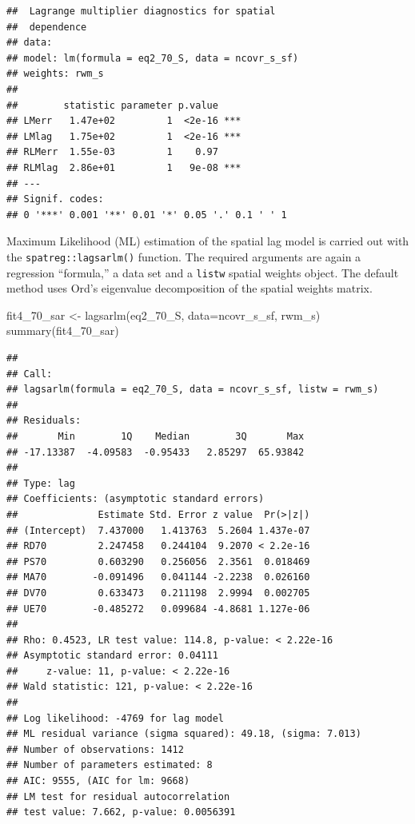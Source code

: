 \documentclass[
  krantz2]{krantz}
\makeatletter
\newenvironment{Shaded}{\begin{snugshade}}{\end{snugshade}}
\newcommand{\AttributeTok}[1]{\textcolor[rgb]{0.61,0.61,0.61}{#1}}
\newcommand{\FunctionTok}[1]{\textcolor[rgb]{0,0,0}{#1}}
\newcommand{\NormalTok}[1]{#1}
\newcommand{\OtherTok}[1]{\textcolor[rgb]{0.37,0.37,0.37}{#1}}
\newenvironment{kframe}{%
\medskip{}
\setlength{\fboxsep}{.8em}
 \def\at@end@of@kframe{}%
 \ifinner\ifhmode%
  \def\at@end@of@kframe{\end{minipage}}%
  \begin{minipage}{\columnwidth}%
 \fi\fi%
 \def\FrameCommand##1{\hskip\@totalleftmargin \hskip-\fboxsep
 \colorbox{shadecolor}{##1}\hskip-\fboxsep
     \hskip-\linewidth \hskip-\@totalleftmargin \hskip\columnwidth}%
 \MakeFramed {\advance\hsize-\width
   \@totalleftmargin\z@ \linewidth\hsize
   \@setminipage}}%
 {\par\unskip\endMakeFramed%
 \at@end@of@kframe}
\renewenvironment{Shaded}{\begin{kframe}}{\end{kframe}}
\makeatother
\begin{document}
\begin{verbatim}
##  Lagrange multiplier diagnostics for spatial
##  dependence
## data:  
## model: lm(formula = eq2_70_S, data = ncovr_s_sf)
## weights: rwm_s
##  
##        statistic parameter p.value    
## LMerr   1.47e+02         1  <2e-16 ***
## LMlag   1.75e+02         1  <2e-16 ***
## RLMerr  1.55e-03         1    0.97    
## RLMlag  2.86e+01         1   9e-08 ***
## ---
## Signif. codes:  
## 0 '***' 0.001 '**' 0.01 '*' 0.05 '.' 0.1 ' ' 1
\end{verbatim}

Maximum Likelihood (ML) estimation of the spatial lag model is carried out with the \texttt{spatreg::lagsarlm()} function. The required arguments are again a regression ``formula,'' a data set and a \texttt{listw} spatial weights object. The default method uses Ord's eigenvalue decomposition of the spatial weights matrix.

\begin{Shaded}
\begin{Highlighting}[]
\NormalTok{fit4\_70\_sar }\OtherTok{\textless{}{-}} \FunctionTok{lagsarlm}\NormalTok{(eq2\_70\_S, }\AttributeTok{data=}\NormalTok{ncovr\_s\_sf, rwm\_s)}
\FunctionTok{summary}\NormalTok{(fit4\_70\_sar)}
\end{Highlighting}
\end{Shaded}

\begin{verbatim}
## 
## Call:
## lagsarlm(formula = eq2_70_S, data = ncovr_s_sf, listw = rwm_s)
## 
## Residuals:
##       Min        1Q    Median        3Q       Max 
## -17.13387  -4.09583  -0.95433   2.85297  65.93842 
## 
## Type: lag 
## Coefficients: (asymptotic standard errors) 
##              Estimate Std. Error z value  Pr(>|z|)
## (Intercept)  7.437000   1.413763  5.2604 1.437e-07
## RD70         2.247458   0.244104  9.2070 < 2.2e-16
## PS70         0.603290   0.256056  2.3561  0.018469
## MA70        -0.091496   0.041144 -2.2238  0.026160
## DV70         0.633473   0.211198  2.9994  0.002705
## UE70        -0.485272   0.099684 -4.8681 1.127e-06
## 
## Rho: 0.4523, LR test value: 114.8, p-value: < 2.22e-16
## Asymptotic standard error: 0.04111
##     z-value: 11, p-value: < 2.22e-16
## Wald statistic: 121, p-value: < 2.22e-16
## 
## Log likelihood: -4769 for lag model
## ML residual variance (sigma squared): 49.18, (sigma: 7.013)
## Number of observations: 1412 
## Number of parameters estimated: 8 
## AIC: 9555, (AIC for lm: 9668)
## LM test for residual autocorrelation
## test value: 7.662, p-value: 0.0056391
\end{verbatim}
\end{document}
